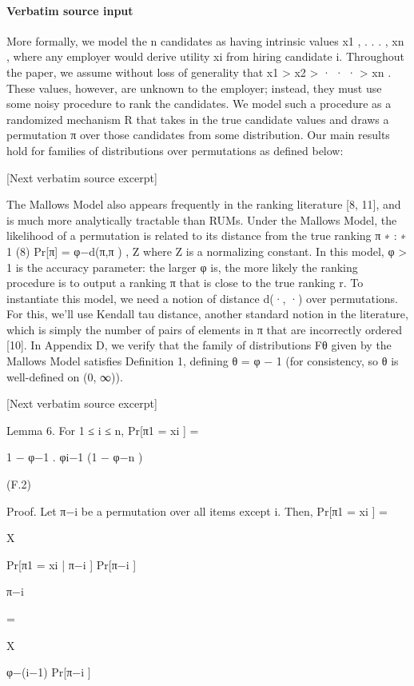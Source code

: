 \documentclass[10pt]{article}
\begin{document}
\paragraph{Verbatim source input}
\begin{ReviewVerbatim}
More formally, we model the n candidates as having intrinsic values x1 , . . . , xn , where any employer would
derive utility xi from hiring candidate i. Throughout the paper, we assume without loss of generality that
x1 > x2 > · · · > xn . These values, however, are unknown to the employer; instead, they must use some
noisy procedure to rank the candidates. We model such a procedure as a randomized mechanism R that
takes in the true candidate values and draws a permutation π over those candidates from some distribution.
Our main results hold for families of distributions over permutations as defined below:

[Next verbatim source excerpt]

The Mallows Model also appears frequently in the ranking literature [8, 11], and is much more analytically
tractable than RUMs. Under the Mallows Model, the likelihood of a permutation is related to its distance
from the true ranking π ∗ :
∗
1
(8)
Pr[π] = φ−d(π,π ) ,
Z
where Z is a normalizing constant. In this model, φ > 1 is the accuracy parameter: the larger φ is, the
more likely the ranking procedure is to output a ranking π that is close to the true ranking r. To instantiate
this model, we need a notion of distance d(·, ·) over permutations. For this, we’ll use Kendall tau distance,
another standard notion in the literature, which is simply the number of pairs of elements in π that are
incorrectly ordered [10]. In Appendix D, we verify that the family of distributions Fθ given by the Mallows
Model satisfies Definition 1, defining θ = φ − 1 (for consistency, so θ is well-defined on (0, ∞)).

[Next verbatim source excerpt]

Lemma 6. For 1 ≤ i ≤ n,
Pr[π1 = xi ] =

1 − φ−1
.
φi−1 (1 − φ−n )

(F.2)

Proof. Let π−i be a permutation over all items except i. Then,
Pr[π1 = xi ] =

X

Pr[π1 = xi | π−i ] Pr[π−i ]

π−i

=

X

φ−(i−1) Pr[π−i ]


\end{ReviewVerbatim}
\end{document}
